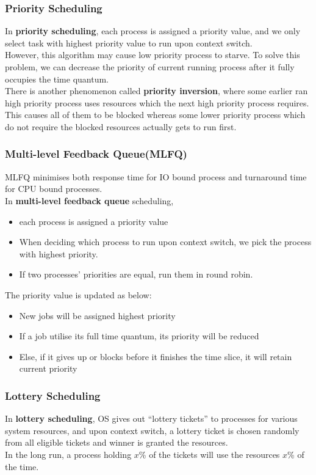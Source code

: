 \documentclass[11pt]{article}
\theoremstyle{definition}
\begin{document}
\subsubsection{Priority Scheduling}
In \textbf{priority scheduling}, each process is assigned a priority value, and we only select task with highest priority value to run upon context switch.\\
However, this algorithm may cause low priority process to starve. To solve this problem, we can decrease the priority of current running process after it fully occupies the time quantum.\\
There is another phenomenon called \textbf{priority inversion}, where some earlier ran high priority process uses resources which the next high priority process requires. This causes all of them to be blocked whereas some lower priority process which do not require the blocked resources actually gets to run first.
\subsubsection{Multi-level Feedback Queue(MLFQ)}
MLFQ minimises both response time for IO bound process and turnaround time for CPU bound processes.\\
In \textbf{multi-level feedback queue} scheduling, 
\begin{itemize}[itemsep=0pt]
  \item each process is assigned a priority value
  \item When deciding which process to run upon context switch, we pick the process with highest priority.
  \item If two processes' priorities are equal, run them in round robin.
\end{itemize} 
The priority value is updated as below:
\begin{itemize}[itemsep=0pt]
  \item New jobs will be assigned highest priority
  \item If a job utilise its full time quantum, its priority will be reduced
  \item Else, if it gives up or blocks before it finishes the time slice, it will retain current priority
\end{itemize}
\subsubsection{Lottery Scheduling}
In \textbf{lottery scheduling}, OS gives out ``lottery tickets'' to processes for various system resources, and upon context switch, a lottery ticket is chosen randomly from all eligible tickets and winner is granted the resources.\\
In the long run, a process holding $x$\% of the tickets will use the resources $x$\% of the time. 
\end{document}
